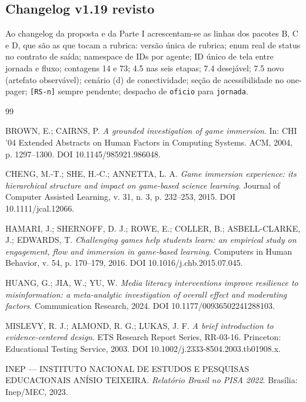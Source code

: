 \documentclass[11pt,a4paper]{article}
\begin{document}
\subsection{Changelog v1.19 revisto}

Ao changelog da proposta e da Parte I acrescentam-se as linhas dos pacotes B, C e D, que são as que
tocam a rubrica: versão única de rubrica; enum real de status no contrato de saída; namespace de IDs
por agente; ID único de tela entre jornada e fluxo; contagens 14 e 73; 4.5 nas seis etapas; 7.4
desejável; 7.5 novo (artefato observável); cenário (d) de conectividade; seção de acessibilidade no
one-pager; \texttt{[RS-n]} sempre pendente; despacho de \texttt{oficio} para \texttt{jornada}.

\begin{thebibliography}{99}
\small

BROWN, E.; CAIRNS, P.
\emph{A grounded investigation of game immersion}.
In: CHI '04 Extended Abstracts on Human Factors in Computing Systems. ACM, 2004, p. 1297--1300.
DOI 10.1145/985921.986048.

CHENG, M.-T.; SHE, H.-C.; ANNETTA, L. A.
\emph{Game immersion experience: its hierarchical structure and impact on game-based science
learning}.
Journal of Computer Assisted Learning, v. 31, n. 3, p. 232--253, 2015.
DOI 10.1111/jcal.12066.

HAMARI, J.; SHERNOFF, D. J.; ROWE, E.; COLLER, B.; ASBELL-CLARKE, J.; EDWARDS, T.
\emph{Challenging games help students learn: an empirical study on engagement, flow and immersion
in game-based learning}.
Computers in Human Behavior, v. 54, p. 170--179, 2016.
DOI 10.1016/j.chb.2015.07.045.

HUANG, G.; JIA, W.; YU, W.
\emph{Media literacy interventions improve resilience to misinformation: a meta-analytic
investigation of overall effect and moderating factors}.
Communication Research, 2024.
DOI 10.1177/00936502241288103.

MISLEVY, R. J.; ALMOND, R. G.; LUKAS, J. F.
\emph{A brief introduction to evidence-centered design}.
ETS Research Report Series, RR-03-16. Princeton: Educational Testing Service, 2003.
DOI 10.1002/j.2333-8504.2003.tb01908.x.

INEP --- INSTITUTO NACIONAL DE ESTUDOS E PESQUISAS EDUCACIONAIS ANÍSIO TEIXEIRA.
\emph{Relatório Brasil no PISA 2022}. Brasília: Inep/MEC, 2023.


\end{thebibliography}
\end{document}
